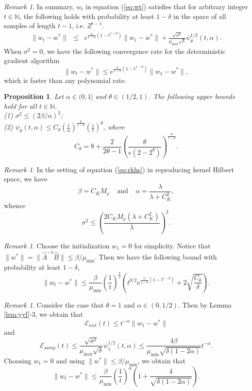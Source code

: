 \documentclass[twoside]{amsart}
\theoremstyle{theorem}
\newtheorem{prop}[thm]{Proposition}
\theoremstyle{definition}
\theoremstyle{remark}
\newtheorem{rem}[thm]{Remark}
\def\Err{{\mathscr E}}
\def\N{{\mathbb N}}
\def\amax{{\mu_{\max}}}
\def\amin{{\mu_{\min}} }
\newcommand{\DS}{\displaystyle}
\begin{document}
\begin{rem}
In summary, $w_t$ in equation (\ref{eq:wt}) satisfies that for arbitrary integer $t\in \N$, the following holds with probability at least $1-\delta$ in the
space of all samples of length $t-1$, i.e. $Z^{t-1}$.
\begin{eqnarray*}
\|w_t-w^\ast\| & \leq &
e^{\frac{\alpha}{1-\theta}(1-t^{1-\theta})} \|w_1-w^\ast\| + \frac{\sqrt{\sigma^2}}{\amax \sqrt{\delta}} \psi^{1/2}_\theta(t,\alpha).
\end{eqnarray*}
When $\sigma^2=0$, we have the following convergence rate for the deterministic gradient algorithm
\[ \|w_t - w^\ast \| \leq e^{\frac{\alpha}{1-\theta}(1-t^{1-\theta})} \|w_1-w^\ast\|, \]
which is faster than any polynomial rate.
\end{rem}

\begin{prop} \label{prop:mnbounds} Let $\alpha\in(0,1]$ and $\theta\in (1/2,1)$. The following upper bounds hold for all $t\in \N$. \\
(1) $\DS \sigma^2 \leq (2\beta /\alpha)^2$; \\
(2) $\DS \psi_\theta(t,\alpha) \leq  C_\theta \left(\frac{1}{\alpha} \right)^{\frac{\theta}{1-\theta}}
\left(\frac{1}{t}\right)^{\theta}$, where
\[ C_\theta = 8 + \frac{2}{2\theta-1} \left(\frac{\theta}{e(2-2^\theta)}
\right)^{\frac{\theta}{1-\theta}}  . \]
\end{prop}

\begin{rem}
In the setting of equation (\ref{eq:rkhs}) in reproducing kernel Hilbert space, we have
\[ \beta = C_K M_\rho \ \ \ \ \ \mbox{and} \ \ \ \ \ \alpha=\frac{\lambda}{\lambda+C^2_K}, \]
whence
\[ \sigma^2 \leq \left(\frac{2C_K M_\rho(\lambda+C^2_K )}{\lambda}\right)^2.\]
\end{rem}

\begin{rem} Choose the initialization $w_1=0$ for simplicity.
Notice that $\|w^\ast\|=\|\hat{A}^{-1}\hat{B}\|\leq \beta /\amin$. Then we have the following bound with probability at least $1-\delta$,
\[ \|w_t - w^\ast \| \leq \frac{\beta}{\amin}\left(\frac{1}{t}\right)^{\frac{\theta}{2}} \left(
t^{\theta/2} e^{\frac{\alpha}{1-\theta}(1-t^{1-\theta})}  +
2\sqrt{\frac{C_\theta}{\delta}}\right). \]
\end{rem}

\begin{rem} \label{rem:Hilbert-theta1}
Consider the case that $\theta=1$ and $\alpha\in (0,1/2)$. Then by Lemma \ref{lem:yyf}-3, we obtain that
\[ \Err_{init}(t) \leq t^{-\alpha} \|w_1 - w^\ast\| \]
and
\[ \Err_{samp}(t) \leq \frac{\sqrt{\sigma^2}}{\amax \sqrt{\delta}} \psi^{1/2}_1(t,\alpha) \leq
\frac{4\beta}{\amin\sqrt{\delta(1-2\alpha)}}t^{-\alpha} . \]
Choosing $w_1=0$ and using $\|w^\ast\|\leq \beta/\amin$, we obtain that
\[ \|w_t - w^\ast \| \leq \frac{\beta}{\amin} \left( \frac{1}{t} \right)^{\alpha}
\left(1+\frac{4}{\sqrt{\delta(1-2\alpha)}}\right). \]
\end{rem}
\end{document}
